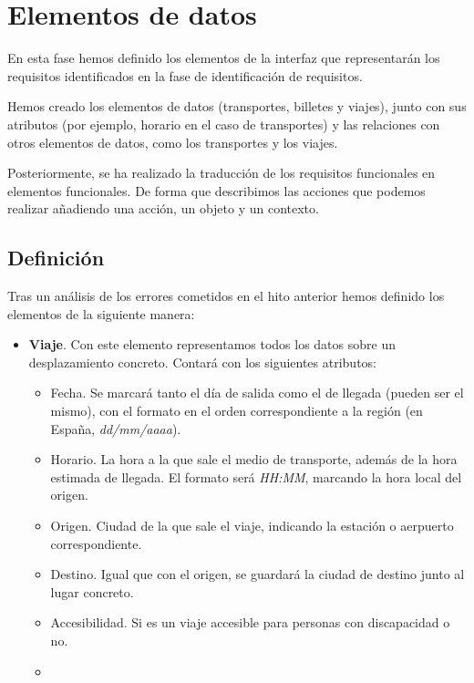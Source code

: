 \section{Elementos de datos}

En esta fase hemos definido los elementos de la interfaz que representarán los
requisitos identificados en la fase de identificación de requisitos.

Hemos creado los elementos de datos (transportes, billetes y viajes), junto con sus
atributos (por ejemplo, horario en el caso de transportes) y las relaciones con otros
elementos de datos, como los transportes y los viajes.

Posteriormente, se ha realizado la traducción de los requisitos funcionales en elementos
funcionales. De forma que describimos las acciones que podemos realizar añadiendo una acción,
un objeto y un contexto.

\subsection{Definición}

Tras un análisis de los errores cometidos en el hito anterior hemos definido los elementos
de la siguiente manera:

\begin{itemize}
    \item \textbf{Viaje}. Con este elemento representamos todos los datos sobre un desplazamiento
    concreto. Contará con los siguientes atributos:
    \begin{itemize}
        \item Fecha. Se marcará tanto el día de salida como el de llegada (pueden ser el mismo),
            con el formato en el orden correspondiente a la región (en España, \textit{dd/mm/aaaa}).
        \item Horario. La hora a la que sale el medio de transporte, además de la hora estimada de 
            llegada. El formato será \textit{HH:MM}, marcando la hora local del origen.
        \item Origen. Ciudad de la que sale el viaje, indicando la estación o aerpuerto correspondiente.
        \item Destino. Igual que con el origen, se guardará la ciudad de destino junto al lugar concreto.
        \item Accesibilidad. Si es un viaje accesible para personas con discapacidad o no.
        \item 
    \end{itemize}

\end{itemize}
